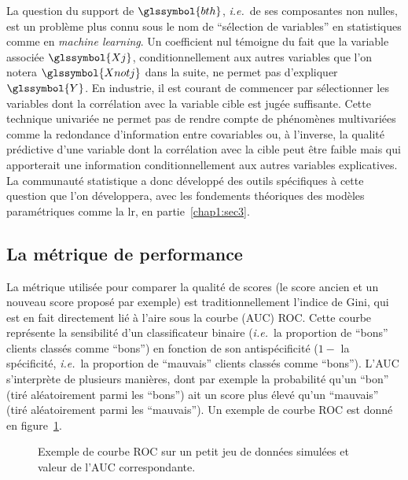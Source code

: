 La question du support  de $\glssymbol{bth}$, \textit{i.e.}\ de ses composantes non nulles, est un problème plus connu sous le nom de ``sélection de variables'' en statistiques comme en \textit{machine learning}. Un coefficient nul témoigne du fait que la variable associée $\glssymbol{Xj}$, conditionnellement aux autres variables que l'on notera $\glssymbol{Xnotj}$ dans la suite, ne permet pas d'expliquer $\glssymbol{Y}$. En industrie, il est courant de commencer par sélectionner les variables dont la corrélation avec la variable cible est jugée suffisante. Cette technique univariée ne permet pas de rendre compte de phénomènes multivariées comme la redondance d'information entre covariables ou, à l'inverse, la qualité prédictive d'une variable dont la corrélation avec la cible peut être faible mais qui apporterait une information conditionnellement aux autres variables explicatives. La communauté statistique a donc développé des outils spécifiques à cette question que l'on développera, avec les fondements théoriques des modèles paramétriques comme la \gls{lr}, en partie~\ref{chap1:sec3}.

\subsection{La métrique de performance}

La métrique utilisée pour comparer la qualité de \glspl{score} (le score ancien et un nouveau score proposé par exemple) est traditionnellement l'indice de Gini, qui est en fait directement lié à l'aire sous la courbe (AUC) ROC. Cette courbe représente la sensibilité d'un classificateur binaire (\textit{i.e.}\ la proportion de ``bons'' clients classés comme ``bons'') en fonction de son antispécificité ($1-$ la spécificité, \textit{i.e.}\ la proportion de ``mauvais'' clients classés comme ``bons''). L'AUC s'interprète de plusieurs manières, dont par exemple la probabilité qu'un ``bon'' (tiré aléatoirement parmi les ``bons'') ait un score plus élevé qu'un ``mauvais'' (tiré aléatoirement parmi les ``mauvais''). Un exemple de courbe ROC est donné en figure~\ref{fig:ROC}.

\begin{figure}
\centering \scalebox{.8}{}
\caption{\label{fig:ROC} Exemple de courbe ROC sur un petit jeu de données simulées et valeur de l'AUC correspondante.}
\end{figure}

